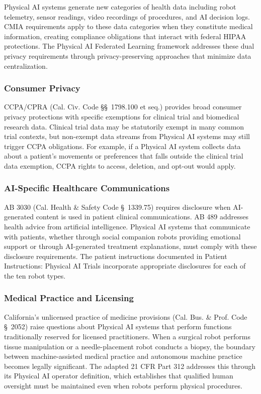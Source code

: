 Physical AI systems generate new categories of health data including robot
telemetry, sensor readings, video recordings of procedures, and AI decision
logs. CMIA requirements apply to these data categories when they constitute
medical information, creating compliance obligations that interact with federal
HIPAA \cite{hipaa} protections. The Physical AI Federated Learning framework
\cite{fl-paper} addresses these dual privacy requirements through
privacy-preserving approaches that minimize data centralization.

\subsubsection{Consumer Privacy}

CCPA/CPRA (Cal. Civ. Code \S\S~1798.100 et seq.) provides broad consumer
privacy protections with specific exemptions for clinical trial and biomedical
research data. Clinical trial data may be statutorily exempt in many common
trial contexts, but non-exempt data streams from Physical AI systems may still
trigger CCPA obligations. For example, if a Physical AI system collects data
about a patient's movements or preferences that falls outside the clinical trial
data exemption, CCPA rights to access, deletion, and opt-out would apply.

\subsubsection{AI-Specific Healthcare Communications}

AB 3030 (Cal. Health \& Safety Code \S~1339.75) requires disclosure when
AI-generated content is used in patient clinical communications. AB 489
addresses health advice from artificial intelligence. Physical AI systems that
communicate with patients, whether through social companion robots providing
emotional support or through AI-generated treatment explanations, must comply
with these disclosure requirements. The patient instructions documented in
Patient Instructions: Physical AI Trials \cite{patient-instructions-paper}
incorporate appropriate disclosures for each of the ten robot types.

\subsubsection{Medical Practice and Licensing}

California's unlicensed practice of medicine provisions (Cal. Bus. \& Prof.
Code \S~2052) raise questions about Physical AI systems that perform functions
traditionally reserved for licensed practitioners. When a surgical robot
performs tissue manipulation or a needle-placement robot conducts a biopsy, the
boundary between machine-assisted medical practice and autonomous machine
practice becomes legally significant. The adapted 21 CFR Part 312
\cite{cfr312-adapt} addresses this through its Physical AI operator definition,
which establishes that qualified human oversight must be maintained even when
robots perform physical procedures.

